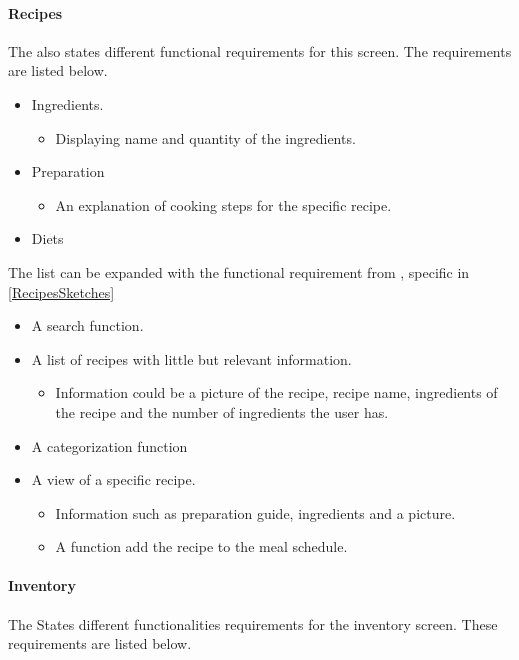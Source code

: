 \paragraph{Recipes}
The  also states different functional requirements for this screen. The requirements are listed below.

\begin{itemize}
	\item Ingredients.
		\begin{itemize}
			\item Displaying name and quantity of the ingredients.
		\end{itemize}
	\item Preparation
		\begin{itemize}
			\item An explanation of cooking steps for the specific recipe.
		\end{itemize}
	\item Diets
\end{itemize} 

The list can be expanded with the functional requirement from , specific in \cref{RecipesSketches}

\begin{itemize}
	\item A search function.
	\item A list of recipes with little but relevant information.
		\begin{itemize}
			\item Information could be a picture of the recipe, recipe name, ingredients of the recipe and the number of ingredients the user has.
		\end{itemize}
	\item A categorization function
	\item A view of a specific recipe.
		\begin{itemize}
			\item Information such as preparation guide, ingredients and a picture.
			\item A function add the recipe to the meal schedule.
		\end{itemize}
\end{itemize}

\paragraph{Inventory}
The  States different functionalities requirements for the inventory screen. These requirements are listed below.

